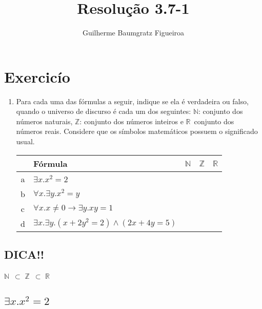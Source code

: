 \documentclass[aspectratio=43]{beamer}
\title[\sc{Resolu\c c\~ao}]{Resolu\c c\~ao 3.7-1}
\author[Guilherme Baumgratz Figueiroa]{Guilherme Baumgratz Figueiroa}
\institute[UFOP]{Universidade Federal de Ouro Preto} %
\date{}
\newcommand{\nat}{$\mathbb{N}$}
\newcommand{\inteiro}{$\mathbb{Z}$}
\newcommand{\real}{$\mathbb{R}$}
\begin{document}
	
	\begin{frame}
		\titlepage
	\end{frame}

	\section{Exercic\'io}

	\begin{frame}[fragile]
    \begin{enumerate}[1.]

		\item Para cada uma das fórmulas a seguir, indique se ela é verdadeira ou falso, quando o universo de discurso é cada um dos seguintes: \nat : conjunto dos n\'umeros naturais, \inteiro : conjunto dos n\'umeros inteiros e \real\ conjunto dos n\'umeros reais. Considere que os símbolos matemáticos possuem o significado usual.\\
        \centering
        \vspace{20pt}
        \begin{tabular}{c|l|c|c|c|}

        	\ & F\'ormula & \nat & \inteiro & \real \\\hline
        	a & $\exists x.x^{2} = 2$ & \ & \ & \  \\
        	b & $\forall x. \exists y. x^{2} = y$ & \ & \ & \  \\
        	c & $\forall x. x \neq 0 \to \exists y.xy = 1 $ & \ & \ & \  \\
        	d & $\exists x. \exists y.(x + 2y^{2} = 2) \land (2x + 4y = 5)$ & \ & \ & \  \\
		\end{tabular}
        
	\end{enumerate}
		
	\end{frame}
    
    \subsection{DICA!!}
	
   	\begin{frame}[fragile]
    
    \centering
    \huge \nat\ $\subset$ \inteiro\ $\subset$ \real

	\end{frame}


    \subsection{$\exists x.x^{2} = 2$}
    
\end{document}
